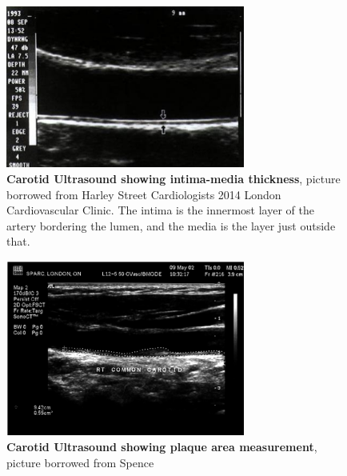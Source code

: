 \begin{figure}[h]
\begin{center}
\includegraphics[width=0.7\textwidth]{intima_media_thickness.png}
\caption{\textbf{Carotid Ultrasound showing intima-media thickness}, picture borrowed from Harley Street Cardiologists 2014 London Cardiovascular Clinic. The intima is the innermost layer of the artery bordering the lumen, and the media is the layer just outside that.}
\end{center}
\end{figure}

\begin{figure}[h]
\begin{center}
\includegraphics[width=0.7\textwidth]{plaque_area.png}
\caption{\textbf{Carotid Ultrasound showing plaque area measurement}, picture borrowed from Spence \cite{spence2006technology}}
\end{center}
\end{figure}

